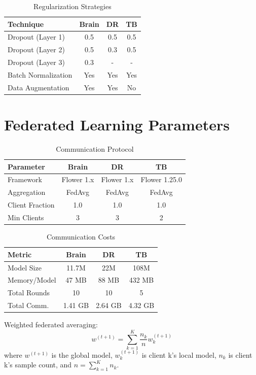 \documentclass[conference]{IEEEtran}
\begin{document}
\begin{table}[!ht]
\centering
\caption{Regularization Strategies}
\begin{tabular}{|l|c|c|c|}
\hline
\textbf{Technique} & \textbf{Brain} & \textbf{DR} & \textbf{TB} \\
\hline
Dropout (Layer 1) & 0.5 & 0.5 & 0.5 \\
Dropout (Layer 2) & 0.5 & 0.3 & 0.5 \\
Dropout (Layer 3) & 0.3 & - & - \\
Batch Normalization & Yes & Yes & Yes \\
Data Augmentation & Yes & Yes & No \\
\hline
\end{tabular}
\end{table}

\section{Federated Learning Parameters}

\begin{table}[!ht]
\centering
\caption{Communication Protocol}
\begin{tabular}{|l|c|c|c|}
\hline
\textbf{Parameter} & \textbf{Brain} & \textbf{DR} & \textbf{TB} \\
\hline
Framework & Flower 1.x & Flower 1.x & Flower 1.25.0 \\
Aggregation & FedAvg & FedAvg & FedAvg \\
Client Fraction & 1.0 & 1.0 & 1.0 \\
Min Clients & 3 & 3 & 2 \\
\hline
\end{tabular}
\end{table}

\begin{table}[!ht]
\centering
\caption{Communication Costs}
\begin{tabular}{|l|c|c|c|}
\hline
\textbf{Metric} & \textbf{Brain} & \textbf{DR} & \textbf{TB} \\
\hline
Model Size & 11.7M & 22M & 108M \\
Memory/Model & 47 MB & 88 MB & 432 MB \\
Total Rounds & 10 & 10 & 5 \\
Total Comm. & 1.41 GB & 2.64 GB & 4.32 GB \\
\hline
\end{tabular}
\end{table}

Weighted federated averaging:
%
\begin{equation}
w^{(t+1)} = \sum_{k=1}^{K} \frac{n_k}{n} w_k^{(t+1)}
\end{equation}
%
where $w^{(t+1)}$ is the global model, $w_k^{(t+1)}$ is client k's local model, $n_k$ is client k's sample count, and $n = \sum_{k=1}^{K} n_k$.
\end{document}
